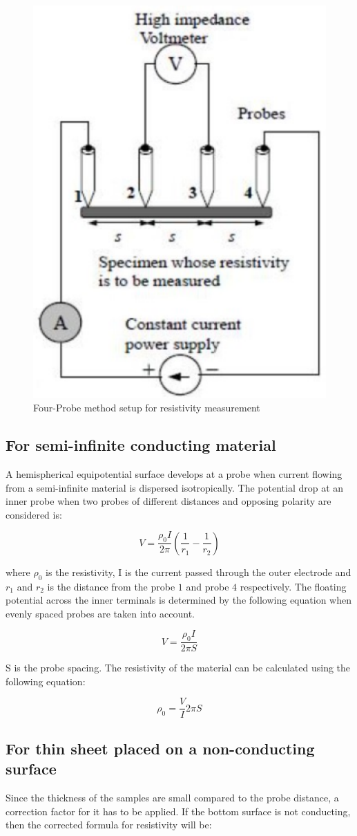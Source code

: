 		\begin{figure}[h]
			\centering
			\includegraphics[width=0.5\columnwidth]{images/th1.png}
			\caption{Four-Probe method setup for resistivity measurement}
			\label{th:1}
		\end{figure}

	\subsection{For semi-infinite conducting material}
		A hemispherical equipotential surface develops at a probe when current flowing from a semi-infinite material is dispersed isotropically. The potential drop at an inner probe when two probes of different distances and opposing polarity are considered is:

		$$V = \frac{\rho_0I}{2\pi}\left(\frac{1}{r_1}-\frac{1}{r_2}\right)$$

		where $\rho_0$ is the resistivity, I is the current passed through the outer electrode and $r_1$ and $r_2$ is the distance from the probe $1$ and probe $4$ respectively. The floating potential across the inner terminals is determined by the following equation when evenly spaced probes are taken into account.

		$$V=\frac{\rho_0I}{2\pi S}$$

		S is the probe spacing. The resistivity of the material can be calculated using the following equation:

		\begin{equation}
			\rho_0 = \frac{V}{I} 2\pi S
			\label{eq:1}
		\end{equation}

	\subsection{For thin sheet placed on a non-conducting surface}
		Since the thickness of the samples are small compared to the probe distance, a correction factor for it has to be applied. If the bottom surface is not conducting, then the corrected formula for resistivity will be:

